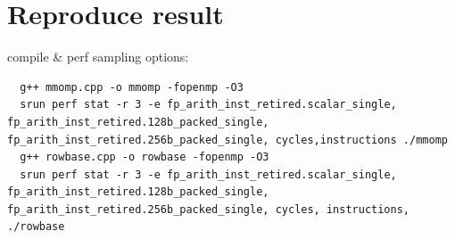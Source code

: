 \documentclass[a4paper]{article}
\begin{document}
\begin{minipage}{0.5\linewidth}
  \noindent{}
\end{minipage}\hfill
\section*{Reproduce result}

compile \& perf sampling options:
\begin{lstlisting}
  g++ mmomp.cpp -o mmomp -fopenmp -O3
  srun perf stat -r 3 -e fp_arith_inst_retired.scalar_single, fp_arith_inst_retired.128b_packed_single, fp_arith_inst_retired.256b_packed_single, cycles,instructions ./mmomp
  g++ rowbase.cpp -o rowbase -fopenmp -O3
  srun perf stat -r 3 -e fp_arith_inst_retired.scalar_single, fp_arith_inst_retired.128b_packed_single, fp_arith_inst_retired.256b_packed_single, cycles, instructions, ./rowbase
\end{lstlisting}
\end{document}
